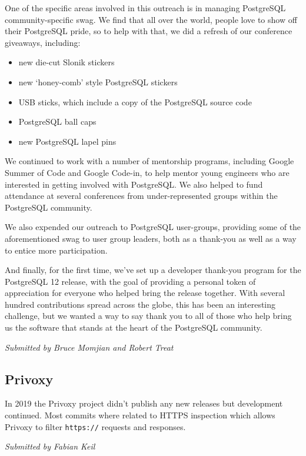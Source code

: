 \documentclass[a4paper]{report}
\begin{document}
One of the specific areas involved in this outreach is in managing
PostgreSQL community-specific swag. We find that all over the world,
people love to show off their PostgreSQL pride, so to help with that, we
did a refresh of our conference giveaways, including:

\begin{itemize}

\item new die-cut Slonik stickers
\item new `honey-comb' style PostgreSQL stickers
\item USB sticks, which include a copy of the PostgreSQL source code
\item PostgreSQL ball caps
\item new PostgreSQL lapel pins

\end{itemize}

We continued to work with a number of mentorship programs, including
Google Summer of Code and Google Code-in, to help mentor young engineers
who are interested in getting involved with PostgreSQL. We also helped
to fund attendance at several conferences from under-represented groups
within the PostgreSQL community.

We also expended our outreach to PostgreSQL user-groups, providing some
of the aforementioned swag to user group leaders, both as a thank-you as
well as a way to entice more participation.

And finally, for the first time, we've set up a developer thank-you
program for the PostgreSQL 12 release, with the goal of providing a
personal token of appreciation for everyone who helped bring the release
together. With several hundred contributions spread across the globe,
this has been an interesting challenge, but we wanted a way to say thank
you to all of those who help bring us the software that stands at the
heart of the PostgreSQL community.

{\em Submitted by Bruce Momjian and Robert Treat}

\subsection{Privoxy}

In 2019 the Privoxy project didn't publish any new releases but
development continued. Most commits where related to HTTPS inspection
which allows Privoxy to filter \texttt{https://} requests and responses.

{\em Submitted by Fabian Keil}
\end{document}
